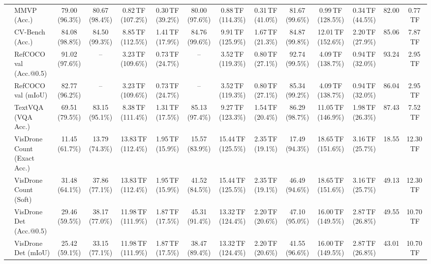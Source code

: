 \begin{table}[t]
\begin{center}
\begin{small}
\begin{sc}
{\begin{tabular}{llcccccccccccc}
& MMVP (Acc.) & 79.00 (96.3\%) & \cellcolor{gray!15}80.67 (98.4\%) & 0.82\,TF (107.2\%) & 0.30\,TF (39.2\%) & 80.00 (97.6\%) & 0.88\,TF (114.3\%) & 0.31\,TF (41.0\%) & \cellcolor{gray!15}81.67 (99.6\%) & 0.99\,TF (128.5\%) & 0.34\,TF (44.5\%) & 82.00 & 0.77\,TF \\
& CV-Bench (Acc.) & 84.08 (98.8\%) & \cellcolor{gray!15}84.50 (99.3\%) & 8.85\,TF (112.5\%) & 1.41\,TF (17.9\%) & \cellcolor{gray!15}84.76 (99.6\%) & 9.91\,TF (125.9\%) & 1.67\,TF (21.3\%) & \cellcolor{gray!15}84.87 (99.8\%) & 12.01\,TF (152.6\%) & 2.20\,TF (27.9\%) & 85.06 & 7.87\,TF \\
& RefCOCO val (Acc.@0.5) & 91.02 (97.6\%) & -- & 3.23\,TF (109.6\%) & 0.73\,TF (24.7\%) & -- & 3.52\,TF (119.3\%) & 0.80\,TF (27.1\%) & \cellcolor{gray!15}92.74 (99.5\%) & 4.09\,TF (138.7\%) & 0.94\,TF (32.0\%) & 93.24 & 2.95\,TF \\
& RefCOCO val (mIoU) & 82.77 (96.2\%) & -- & 3.23\,TF (109.6\%) & 0.73\,TF (24.7\%) & -- & 3.52\,TF (119.3\%) & 0.80\,TF (27.1\%) & \cellcolor{gray!15}85.34 (99.2\%) & 4.09\,TF (138.7\%) & 0.94\,TF (32.0\%) & 86.04 & 2.95\,TF \\
& TextVQA (VQA Acc.) & 69.51 (79.5\%) & 83.15 (95.1\%) & 8.38\,TF (111.4\%) & 1.31\,TF (17.5\%) & 85.13 (97.4\%) & 9.27\,TF (123.3\%) & 1.54\,TF (20.4\%) & \cellcolor{gray!15}86.29 (98.7\%) & 11.05\,TF (146.9\%) & 1.98\,TF (26.3\%) & 87.43 & 7.52\,TF \\
& VisDrone Count (Exact Acc.) & 11.45 (61.7\%) & 13.79 (74.3\%) & 13.83\,TF (112.4\%) & 1.95\,TF (15.9\%) & 15.57 (83.9\%) & 15.44\,TF (125.5\%) & 2.35\,TF (19.1\%) & 17.49 (94.3\%) & 18.65\,TF (151.6\%) & 3.16\,TF (25.7\%) & 18.55 & 12.30\,TF \\
& VisDrone Count (Soft) & 31.48 (64.1\%) & 37.86 (77.1\%) & 13.83\,TF (112.4\%) & 1.95\,TF (15.9\%) & 41.52 (84.5\%) & 15.44\,TF (125.5\%) & 2.35\,TF (19.1\%) & 46.49 (94.6\%) & 18.65\,TF (151.6\%) & 3.16\,TF (25.7\%) & 49.13 & 12.30\,TF \\
& VisDrone Det (Acc.@0.5) & 29.46 (59.5\%) & 38.17 (77.0\%) & 11.98\,TF (111.9\%) & 1.87\,TF (17.5\%) & 45.31 (91.4\%) & 13.32\,TF (124.4\%) & 2.20\,TF (20.6\%) & 47.10 (95.0\%) & 16.00\,TF (149.5\%) & 2.87\,TF (26.8\%) & 49.55 & 10.70\,TF \\
& VisDrone Det (mIoU) & 25.42 (59.1\%) & 33.15 (77.1\%) & 11.98\,TF (111.9\%) & 1.87\,TF (17.5\%) & 38.47 (89.4\%) & 13.32\,TF (124.4\%) & 2.20\,TF (20.6\%) & 41.55 (96.6\%) & 16.00\,TF (149.5\%) & 2.87\,TF (26.8\%) & 43.01 & 10.70\,TF \\

\end{tabular}}
\end{sc}
\end{small}
\end{center}
\end{table}
